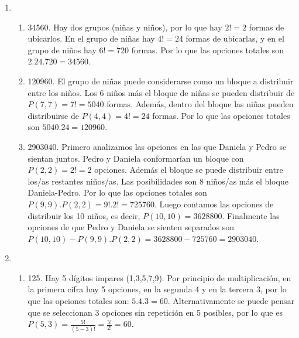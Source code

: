 \documentclass[a4paper]{article}
\newcommand{\exercise}{\item}
\begin{document}
\begin{enumerate}
\begin{enumerate} [label=(\alph*)]
		\item $7^{28}$. En este caso conviene asociar las puertas al personal. Cada médico/a entró por una puerta, que puede ser cualquiera de las 7, por lo que hay $7^{28}$ opciones.
		\item 1344904. Sólo nos interesa contar la cantidad de veces que una persona pasó por cada molinete utilizando a las 28 personas como ocasiones de conteo. Se trata de una combinación de 7 molinetes en 28 veces, con repetición, es decir $C^{R}(7,28)=\binom{34}{28}=1344904$.
		\item 352716. El ejercicio es similar a una combinación de 12 pisos en 10 pasajeros, es decir, $C^R(12,10)=\binom{21}{10}=352716$ opciones.
		\item 8. Con 8 tipos de café hay $8.2.2=32$ variantes de la promoción. Notar que con 7 tipos de café no alcanza, ya que solo serían $7.2.2=28$ y algunos meses tienen 31 días.
\end{enumerate}\exercise\begin{enumerate} [label=(\alph*)]		\item 34560. Hay dos grupos (niñas y niños), por lo que hay $2!=2$ formas de ubicarlos. En el grupo de niñas hay $4!=24$ formas de ubicarlas, y en el grupo de niños hay $6!=720$ formas. Por lo que las opciones totales son $2.24.720=34560$.
		\item 120960. El grupo de niñas puede considerarse como un bloque a distribuir entre los niños. Los 6 niños más el bloque de niñas se pueden distribuir de $P(7,7)=7!=5040$ formas. Además, dentro del bloque las niñas pueden distribuirse de $P(4,4)=4!=24$ formas. Por lo que las opciones totales son $5040.24=120960$.
		\item 2903040. Primero analizamos las opciones en las que Daniela y Pedro se sientan juntos. Pedro y Daniela conformarían un bloque con $P(2,2)=2!=2$ opciones. Además el bloque se puede distribuir entre los/as restantes niños/as. Las posibilidades son 8 niños/as más el bloque Daniela-Pedro. Por lo que las opciones totales son $P(9,9).P(2,2)=9!.2!=725760$. Luego contamos las opciones de distribuir los 10 niños, es decir, $P(10,10)=3628800$. Finalmente las opciones de que Pedro y Daniela se sienten separados son $P(10,10)-P(9,9).P(2,2)=3628800-725760=2903040$.
\end{enumerate}\exercise\begin{enumerate} [label=(\alph*)]		\item 125. Hay 5 dígitos impares (1,3,5,7,9). Por principio de multiplicación, en la primera cifra hay 5 opciones, en la segunda 4 y en la tercera 3, por lo que las opciones totales son: $5.4.3 = 60$. Alternativamente se puede pensar que se seleccionan 3 opciones sin repetición en 5 posibles, por lo que es $P(5,3)=\frac{5!}{(5-3)!}=\frac{5!}{2!}=60$.

\end{enumerate}
\end{enumerate}
\end{document}
